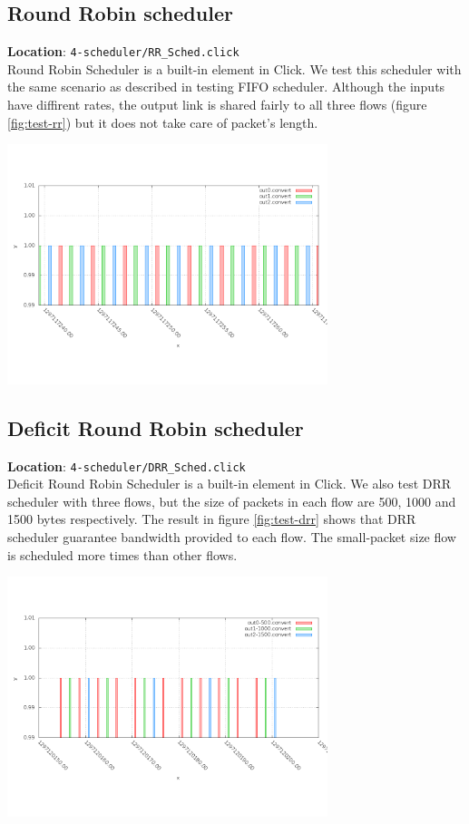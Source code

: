 \documentclass[a4paper]{article}
\begin{document}
  \subsection{Round Robin scheduler}
  \textbf{Location}: \texttt{4-scheduler/RR\_Sched.click}\\
  Round Robin Scheduler is a built-in element in Click. We test this scheduler with the same scenario as described in testing FIFO scheduler. Although the inputs have diffirent rates, the output link is shared fairly to all three flows (figure \ref{fig:test-rr}) but it does not take care of packet's length.
  \begin{center}
	\includegraphics[width=0.70\textwidth]{rr-dense.png}
	\label{fig:test-rr}
  \end{center}
  
  \subsection{Deficit Round Robin scheduler}
  \textbf{Location}: \texttt{4-scheduler/DRR\_Sched.click}\\
  Deficit Round Robin Scheduler is a built-in element in Click. We also test DRR scheduler with three flows, but the size of packets in each flow are 500, 1000 and 1500 bytes respectively. The result in figure \ref{fig:test-drr} shows that DRR scheduler guarantee bandwidth provided to each flow. The small-packet size flow is scheduled more times than other flows.
  \begin{center}
	\includegraphics[width=0.70\textwidth]{drr-dense.png}
	\label{fig:test-drr}
  \end{center}
  
\end{document}
